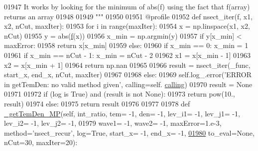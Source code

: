 \begin{DoxyCode}
{{01947 \textcolor{stringliteral}{            It works by looking for the minimum of abs(f) using the fact that f(array) returns an array}
01948 \textcolor{stringliteral}{}
01949 \textcolor{stringliteral}{            """}
01950             
01951             @profile
01952             \textcolor{keyword}{def }nsect\_iter(f, x1, x2, nCut, maxIter):
01953                 \textcolor{keywordflow}{for} i \textcolor{keywordflow}{in} range(maxIter):
01954                     x = np.linspace(x1, x2, nCut)
01955                     y = abs(\hyperlink{namespacepyneb_1_1utils_1_1_fortran_format_af94352584eced016c14d524330879115}{f}(x))
01956                     x\_min = np.argmin(y)
01957                     \textcolor{keywordflow}{if} y[x\_min] < maxError:
01958                         \textcolor{keywordflow}{return} x[x\_min]
01959                     \textcolor{keywordflow}{else}:
01960                         \textcolor{keywordflow}{if} x\_min == 0: x\_min = 1
01961                         \textcolor{keywordflow}{if} x\_min == nCut - 1: x\_min = nCut - 2
01962                         x1 = x[x\_min - 1]
01963                         x2 = x[x\_min + 1]
01964                 \textcolor{keywordflow}{return} np.nan
01965 
01966             result = nsect\_iter(\_func, start\_x, end\_x, nCut, maxIter)
01967             
01968         \textcolor{keywordflow}{else}:
01969             self.log\_.error(\textcolor{stringliteral}{'ERROR in getTemDen: no valid method given'}, calling=self.
      \hyperlink{classpyneb_1_1core_1_1pynebcore_1_1_atom_a373b7735acf4f528b54bddf373ad67a1}{calling})
01970             result = \textcolor{keywordtype}{None}
01971 
01972         \textcolor{keywordflow}{if} (log \textcolor{keywordflow}{is} \textcolor{keyword}{True}) \textcolor{keywordflow}{and} (result \textcolor{keywordflow}{is} \textcolor{keywordflow}{not} \textcolor{keywordtype}{None}):
01973             \textcolor{keywordflow}{return} pow(10., result)
01974         \textcolor{keywordflow}{else}:
01975             \textcolor{keywordflow}{return} result
01976 
01977 
01978     \textcolor{keyword}{def }\hyperlink{classpyneb_1_1core_1_1pynebcore_1_1_atom_a3a7c4f43d58a5988d04cbe23ed9593ba}{\_getTemDen\_MP}(self, int\_ratio, tem= -1, den= -1, lev\_i1= -1, lev\_j1= -1, lev\_i2= -1, 
      lev\_j2= -1,
01979                   wave1= -1, wave2= -1, maxError=1.e-3, method=\textcolor{stringliteral}{'nsect\_recur'}, log=\textcolor{keyword}{True}, start\_x= -1, end\_x=
       -1,
\hypertarget{pynebcore_8py_source_l01980}{}\hyperlink{classpyneb_1_1core_1_1pynebcore_1_1_atom_a3a7c4f43d58a5988d04cbe23ed9593ba}{01980}                   to\_eval=\textcolor{keywordtype}{None}, nCut=30, maxIter=20):
}}
\end{DoxyCode}
